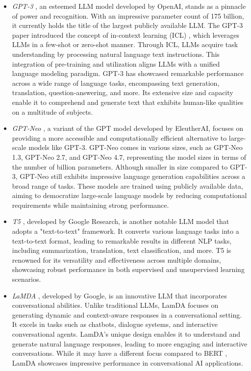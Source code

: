 \documentclass[conference]{IEEEtran}
\begin{document}
\begin{itemize}
    \item \textit{GPT-3} \cite{gpt-3}, an esteemed LLM model developed by OpenAI, stands as a pinnacle of power and recognition. With an impressive parameter count of 175 billion, it currently holds the title of the largest publicly available LLM. The GPT-3 paper introduced the concept of in-context learning (ICL) \cite{incontextlearning}, which leverages LLMs in a few-shot \cite{few-shot} or zero-shot \cite{zero-shot} manner. Through ICL, LLMs acquire task understanding by processing natural language text instructions. This integration of pre-training and utilization aligns LLMs with a unified language modeling paradigm. GPT-3 has showcased remarkable performance across a wide range of language tasks, encompassing text generation, translation, question-answering, and more. Its extensive size and capacity enable it to comprehend and generate text that exhibits human-like qualities on a multitude of subjects.
    \item \textit{GPT-Neo} \cite{gpt-neo}, a variant of the GPT model developed by EleutherAI, focuses on providing a more accessible and computationally efficient alternative to large-scale models like GPT-3. GPT-Neo comes in various sizes, such as GPT-Neo 1.3, GPT-Neo 2.7, and GPT-Neo 4.7, representing the model sizes in terms of the number of billion parameters. Although smaller in size compared to GPT-3, GPT-Neo still exhibits impressive language generation capabilities across a broad range of tasks. These models are trained using publicly available data, aiming to democratize large-scale language models by reducing computational requirements while maintaining strong performance.
    \item \textit{T5} \cite{t5}, developed by Google Research, is another notable LLM model that adopts a "text-to-text" framework. It converts various language tasks into a text-to-text format, leading to remarkable results in different NLP tasks, including summarization, translation, text classification, and more. T5 is renowned for its versatility and effectiveness across multiple domains, showcasing robust performance in both supervised and unsupervised learning scenarios.
    \item \textit{LaMDA} \cite{lamda}, developed by Google, is an innovative LLM that incorporates conversational abilities. Unlike traditional LLMs, LamDA focuses on generating dynamic and context-aware responses in a conversational setting. It excels in tasks such as chatbots, dialogue systems, and interactive conversational agents. LamDA's unique design enables it to understand and generate natural language responses, leading to more engaging and interactive conversations. While it may have a different focus compared to BERT \cite{bert}, LamDA showcases impressive performance in conversational AI applications.\\
\end{itemize}
\end{document}
